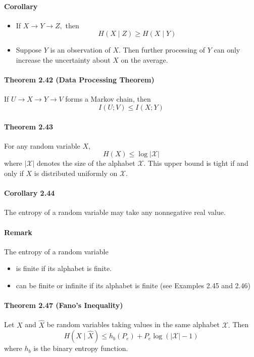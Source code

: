 \documentclass[8pt]{article}
\begin{document}
\paragraph{Corollary}
\begin{itemize}
	\item If $X \rightarrow Y \rightarrow Z,$ then $$H(X \mid Z) \geq H(X \mid Y)$$
	\item Suppose $Y$ is an observation of $X .$ Then further processing of $Y$ can only increase the uncertainty about $X$ on the average.
\end{itemize}

\paragraph{Theorem 2.42 (Data Processing Theorem)} If $U \rightarrow X \rightarrow Y \rightarrow V$ forms a Markov chain, then
$$
I(U ; V) \leq I(X ; Y)
$$

\paragraph{Theorem 2.43} For any random variable $X$,
$$
H(X) \leq \log |\mathcal{X}|
$$
where $|\mathcal{X}|$ denotes the size of the alphabet $\mathcal{X}$. This upper bound is tight if and only if $X$ is distributed uniformly on $\mathcal{X}$.

\paragraph{Corollary 2.44} The entropy of a random variable may take any nonnegative real value.
\paragraph{Remark} The entropy of a random variable
\begin{itemize}
	\item is finite if its alphabet is finite.
	\item can be finite or infinite if its alphabet is finite (see Examples 2.45 and 2.46)
\end{itemize}

\paragraph{Theorem 2.47 (Fano's Inequality)} Let $X$ and $\hat{X}$ be random variables taking values in the same alphabet $\mathcal{X} .$ Then
$$
H(X \mid \hat{X}) \leq h_{b}\left(P_{e}\right)+P_{e} \log (|\mathcal{X}|-1)
$$
where $h_{b}$ is the binary entropy function.
\end{document}
